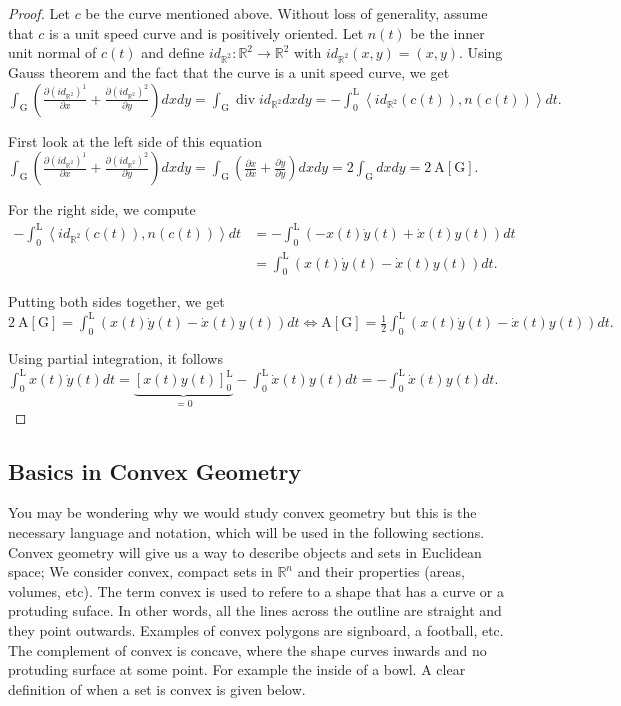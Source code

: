 \documentclass[a4paper]{book}
\numberwithin{theorem}{section}%
\begin{document}
\begin{proof}
    Let $c$ be the curve mentioned above. Without loss of generality, assume that $c$ is a unit speed curve and is positively oriented. Let $n(t)$ be the inner unit normal of $c(t)$ and define $i d_{\mathbb{R}^2}: \mathbb{R}^2 \rightarrow \mathbb{R}^2$ with $i d_{\mathbb{R}^2}(x, y)=(x, y)$. Using Gauss theorem and the fact that the curve is a unit speed curve, we get
    $\int_{\mathrm{G}}\left(\frac{\partial\left(i d_{\mathbb{R}^2}\right)^1}{\partial x}+\frac{\partial\left(i d_{\mathbb{R}^2}\right)^2}{\partial y}\right) d x d y=\int_{\mathrm{G}} \operatorname{div} i d_{\mathbb{R}^2} d x d y=-\int_0^{\mathrm{L}}\left\langle i d_{\mathbb{R}^2}(c(t)), n(c(t))\right\rangle d t .$

    First look at the left side of this equation
    $\int_{\mathrm{G}}\left(\frac{\partial\left(i d_{\mathbb{R}^2}\right)^1}{\partial x}+\frac{\partial\left(i d_{\mathbb{R}^2}\right)^2}{\partial y}\right) d x d y=\int_{\mathrm{G}}\left(\frac{\partial x}{\partial x}+\frac{\partial y}{\partial y}\right) d x d y=2 \int_{\mathrm{G}} d x d y=2 \mathrm{~A}[\mathrm{G}] .$

    For the right side, we compute
    $\begin{aligned}
    -\int_0^{\mathrm{L}}\left\langle i d_{\mathbb{R}^2}(c(t)), n(c(t))\right\rangle d t & =-\int_0^{\mathrm{L}}(-x(t) \dot{y}(t)+\dot{x}(t) y(t)) d t \\
    & =\int_0^{\mathrm{L}}(x(t) \dot{y}(t)-\dot{x}(t) y(t)) d t .
    \end{aligned}$

    Putting both sides together, we get
    $2 \mathrm{~A}[\mathrm{G}]=\int_0^{\mathrm{L}}(x(t) \dot{y}(t)-\dot{x}(t) y(t)) d t \Leftrightarrow \mathrm{A}[\mathrm{G}]=\frac{1}{2} \int_0^{\mathrm{L}}(x(t) \dot{y}(t)-\dot{x}(t) y(t)) d t .$

    Using partial integration, it follows
    $\int_0^{\mathrm{L}} x(t) \dot{y}(t) d t=\underbrace{[x(t) y(t)]_0^{\mathrm{L}}}_{=0}-\int_0^{\mathrm{L}} \dot{x}(t) y(t) d t=-\int_0^{\mathrm{L}} \dot{x}(t) y(t) d t .$
\end{proof}

\subsection{Basics in Convex Geometry}
You may be wondering why we would study convex geometry but this is the necessary language and notation, which will be used in the following sections. Convex geometry will give us a way to describe objects and sets in Euclidean space; We consider convex, compact sets in $\mathbb{R}^n$ and their properties (areas, volumes, etc). The term convex is used to refere to a shape that has a curve or a protuding suface. In other words, all the lines across the outline are straight and they point outwards. Examples of convex polygons are signboard, a football, etc. The complement of convex is concave, where the shape curves inwards and no protuding surface at some point. For example the inside of a bowl. A clear definition of when a set is convex is given below. 
\end{document}
